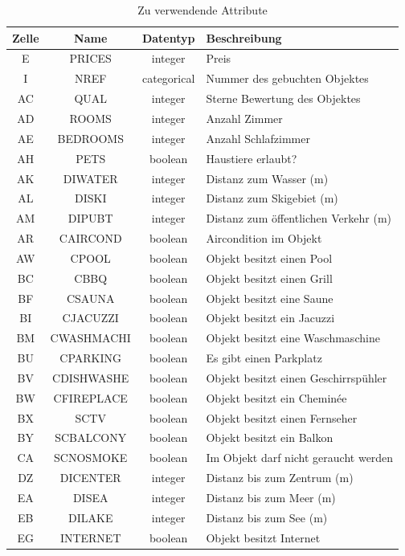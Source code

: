 \begin{table}[H] 
	\caption{Zu verwendende Attribute}
	\centering
	\label{fig:recherche:attributeinschraenkung:2}
	\begin{tabular}{ | c | c | c | l | } 
		\hline 
		\rowcolor{tableheadcolor}
		\bfseries Zelle & \bfseries Name & \bfseries Datentyp & \bfseries Beschreibung \\ \hline 
		E & PRICES & integer & Preis \\ \hline 
		I & NREF & categorical & Nummer des gebuchten Objektes \\ \hline 
		AC & QUAL & integer & Sterne Bewertung des Objektes \\ \hline 
		AD & ROOMS & integer & Anzahl Zimmer \\ \hline 
		AE & BEDROOMS & integer & Anzahl Schlafzimmer \\ \hline 
		AH & PETS & boolean & Haustiere erlaubt? \\ \hline 
		AK & DIWATER & integer & Distanz zum Wasser (m) \\ \hline 
		AL & DISKI & integer & Distanz zum Skigebiet (m) \\ \hline 
		AM & DIPUBT & integer & Distanz zum öffentlichen Verkehr (m) \\ \hline 
		AR & CAIRCOND & boolean & Aircondition im Objekt\\ \hline 
		AW & CPOOL & boolean & Objekt besitzt einen Pool \\ \hline 
		BC & CBBQ & boolean & Objekt besitzt einen Grill \\ \hline 
		BF & CSAUNA & boolean & Objekt besitzt eine Saune \\ \hline 
		BI & CJACUZZI & boolean & Objekt besitzt ein Jacuzzi \\ \hline 
		BM & CWASHMACHI & boolean & Objekt besitzt eine Waschmaschine \\ \hline 
		BU & CPARKING & boolean & Es gibt einen Parkplatz \\ \hline 
		BV & CDISHWASHE & boolean & Objekt besitzt einen Geschirrspühler \\ \hline
		BW & CFIREPLACE & boolean & Objekt besitzt ein Cheminée \\ \hline 
		BX & SCTV & boolean & Objekt besitzt einen Fernseher \\ \hline  
		BY & SCBALCONY & boolean & Objekt besitzt ein Balkon \\ \hline 
		CA & SCNOSMOKE & boolean & Im Objekt darf nicht geraucht werden \\ \hline 
		DZ & DICENTER & integer & Distanz bis zum Zentrum (m) \\ \hline 
		EA & DISEA & integer & Distanz bis zum Meer (m) \\ \hline 
		EB & DILAKE & integer & Distanz bis zum See (m) \\ \hline 
		EG & INTERNET & boolean & Objekt besitzt Internet \\ \hline 
	\end{tabular}
\end{table}

